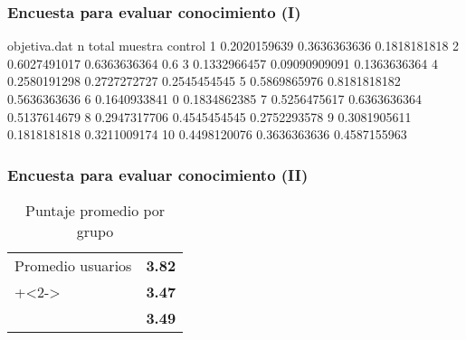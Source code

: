 \begin{frame}[t,fragile]
\frametitle{Encuesta para evaluar conocimiento (I)}
\centering

\begin{filecontents}{objetiva.dat}
n	total        muestra	    control
1	0.2020159639 0.3636363636	0.1818181818
2	0.6027491017 0.6363636364	0.6
3	0.1332966457 0.09090909091	0.1363636364
4	0.2580191298 0.2727272727	0.2545454545
5	0.5869865976 0.8181818182	0.5636363636
6	0.1640933841 0	            0.1834862385
7	0.5256475617 0.6363636364	0.5137614679
8	0.2947317706 0.4545454545	0.2752293578
9	0.3081905611 0.1818181818	0.3211009174
10	0.4498120076 0.3636363636	0.4587155963
\end{filecontents}


\end{frame}
\begin{frame}
\frametitle{Encuesta para evaluar conocimiento (II)}

\begin{table}
\begin{tabular}{lr}
\toprule
Promedio usuarios & \textbf{3.82} \\
\onslide+<2->{Promedio control  & \textbf{3.47} \\\midrule}
\onslide+<3->{Promedio total    & \textbf{3.49}}
\\\bottomrule
\end{tabular}
\caption{Puntaje promedio por grupo}
\end{table}

\end{frame}

